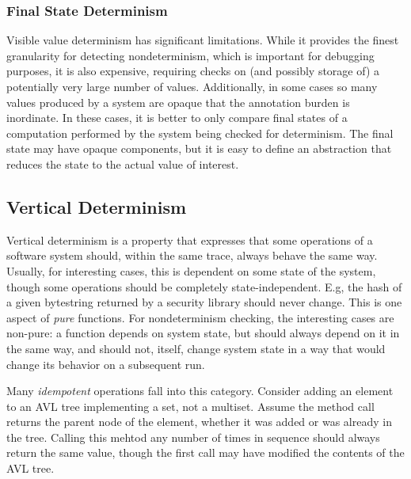 \subsubsection{Final State Determinism}

Visible value determinism has significant limitations.  While it
provides the finest granularity for detecting nondeterminism, which is
important for debugging purposes, it is also expensive, requiring
checks on (and possibly storage of) a potentially very large number of
values.  Additionally, in some cases so many values produced by a
system are opaque that the annotation burden is inordinate.  In these
cases, it is better to only compare final states of a computation
performed by the system being checked for determinism.  The final
state may have opaque components, but it is easy to define an
abstraction that reduces the state to the actual value of interest.



\subsection{Vertical Determinism}

Vertical determinism is a property that expresses that some operations
of a software system should, within the same trace, always behave the
same way.  Usually, for interesting cases, this is dependent on some
state of the system, though some operations should be completely
state-independent.  E.g, the hash of a given bytestring returned by a
security library should never change.  This is one aspect of
\emph{pure} functions.  For nondeterminism checking, the interesting
cases are non-pure: a function depends on system state, but should
always depend on it in the same way, and should not, itself, change
system state in a way that would change its behavior on a subsequent
run.

Many \emph{idempotent} operations fall into this category.
Consider adding an element to an AVL tree implementing a set, not a
multiset.  Assume the method call returns the parent node of the
element, whether it was added or was already in the tree.  Calling
this mehtod any number of times in sequence should always return the
same value, though the first call may have modified the contents of
the AVL tree.

